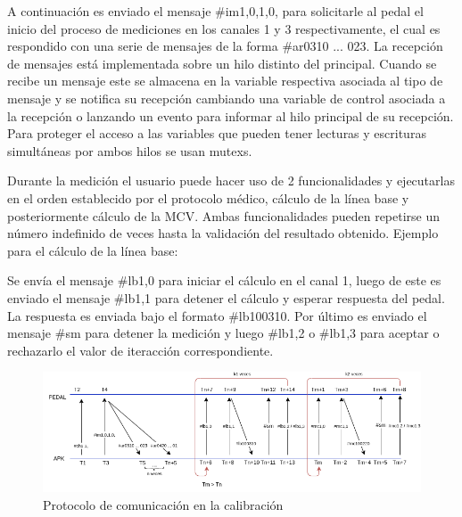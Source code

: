 \vspace{5pt}
A continuación es enviado el mensaje \#im1,0,1,0, para solicitarle al pedal el inicio del proceso de mediciones en los canales 1 y 3  respectivamente, el cual es respondido con una serie de mensajes de la forma \#ar0310 ... 023. La recepción de mensajes está implementada sobre un hilo distinto del principal. Cuando se recibe un mensaje este se almacena en la variable respectiva asociada al tipo de mensaje y se notifica su recepción cambiando una variable de control asociada a la recepción o lanzando un evento para informar al hilo principal de su recepción. Para proteger el acceso a las variables que pueden tener lecturas y escrituras simultáneas por ambos hilos se usan mutexs.

\vspace{5pt}
Durante la medición el usuario puede hacer uso de 2 funcionalidades y ejecutarlas en el orden establecido por el protocolo médico, cálculo de la línea base y posteriormente cálculo de la MCV. Ambas funcionalidades pueden repetirse un número indefinido de veces hasta la validación del resultado obtenido. Ejemplo para el cálculo de la línea base:
    
\vspace{5pt}
Se envía el mensaje \#lb1,0 para iniciar el cálculo en el canal 1, luego de este es enviado el mensaje  \#lb1,1 para detener el cálculo y esperar respuesta del pedal. La respuesta es enviada bajo el formato  \#lb100310. Por último es enviado el mensaje \#sm para detener la medición y luego \#lb1,2 o \#lb1,3 para aceptar o rechazarlo el valor de iteracción correspondiente.  

\begin{figure}[ht]
    \centering
    \includegraphics[scale=0.58]{images/diagram-protocol-in-calibration.png}
    \caption{Protocolo de comunicación en la calibración}
    \label{fig: diagram-protocol-in-calibration}
\end{figure}
